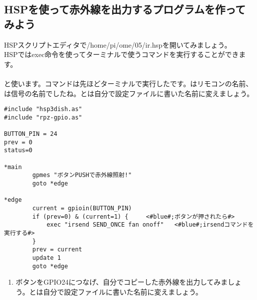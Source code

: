 \subsection{HSPを使って赤外線を出力するプログラムを作ってみよう}
HSPスクリプトエディタで/home/pi/ome/05/ir.hspを開いてみましょう。\\
HSPではexec命令を使ってターミナルで使うコマンドを実行することができます。\\
\\
と使います。コマンドは先ほどターミナルで実行したです。\code{\textcolor{red}{fan}}はリモコンの名前、\code{\textcolor{red}{onoff}}は信号の名前でしたね。\code{\textcolor{red}{fan}}と\code{\textcolor{red}{onoff}}は自分で設定ファイルに書いた名前に変えましょう。\\

\begin{lstlisting}[caption=ir.hsp,label=ir.hsp]
#include "hsp3dish.as"
#include "rpz-gpio.as"

BUTTON_PIN = 24
prev = 0
status=0

*main
        gpmes "ボタンPUSHで赤外線照射!"
        goto *edge

*edge
        current = gpioin(BUTTON_PIN)
        if (prev=0) & (current=1) {		<#blue#;ボタンが押されたら#>
            exec "irsend SEND_ONCE fan onoff"	<#blue#;irsendコマンドを実行する#>
        }
        prev = current
        update 1
        goto *edge
\end{lstlisting}

\begin{tcolorbox}[title=\useOmetoi]
\begin{enumerate}
\item ボタンをGPIO24につなげ、自分でコピーした赤外線を出力してみましょう。\code{\textcolor{red}{fan}}と\code{\textcolor{red}{onoff}}は自分で設定ファイルに書いた名前に変えましょう。
\end{enumerate}
\end{tcolorbox}